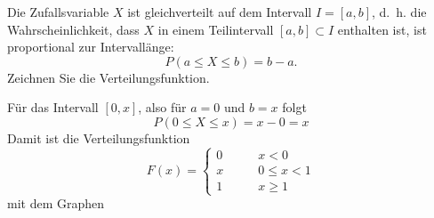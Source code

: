 Die Zufallsvariable $X$ ist gleichverteilt auf dem Intervall $I=[a,b]$,
d.~h. die Wahrscheinlichkeit, dass $X$ in einem Teilintervall $[a,b]\subset I$
enthalten ist, ist
proportional zur Intervallänge:
\[
P(a\le X\le b) = b-a.
\]
Zeichnen Sie die Verteilungsfunktion.

\begin{loesung}
Für das Intervall $[0,x]$, also für $a=0$ und $b=x$ folgt
\[
P(0\le X\le x)
=
x-0
=
x
\]
Damit ist die Verteilungsfunktion
\[
F(x)
=
\begin{cases}
0&\qquad x < 0\\
x&\qquad 0\le x < 1\\
1&\qquad x \ge 1
\end{cases}
\]
mit dem Graphen 
\begin{center}
\end{center}
\end{loesung}


